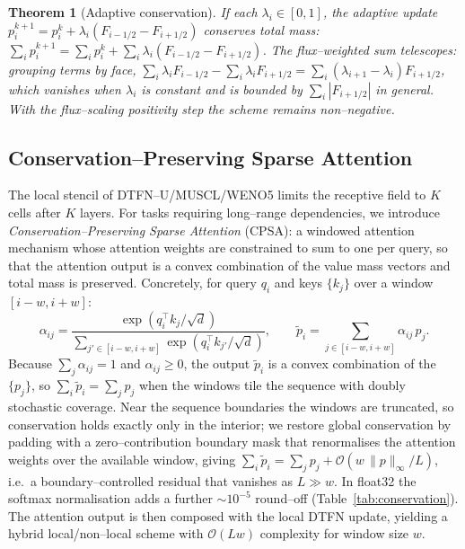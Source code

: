 \documentclass[10pt]{article}
\newtheorem{theorem}{Theorem}
\theoremstyle{definition}
\theoremstyle{remark}
\begin{document}
\begin{theorem}[Adaptive conservation]
  \label{thm:adaptive}
  If each $\lambda_i \in [0,1]$, the adaptive update
  $p^{k+1}_i = p^k_i + \lambda_i (F_{i-1/2} - F_{i+1/2})$ conserves
  total mass:
  $\sum_i p^{k+1}_i = \sum_i p^k_i + \sum_i \lambda_i(F_{i-1/2} - F_{i+1/2})$.
  The flux--weighted sum telescopes: grouping terms by face,
  $\sum_i \lambda_i F_{i-1/2} - \sum_i \lambda_i F_{i+1/2} = \sum_i
  (\lambda_{i+1} - \lambda_i) F_{i+1/2}$, which vanishes when
  $\lambda_i$ is constant and is bounded by $\sum_i |F_{i+1/2}|$ in
  general.  With the flux--scaling positivity step the scheme remains
  non--negative.
\end{theorem}

\subsection{Conservation--Preserving Sparse Attention}
\label{sec:cpsa}

The local stencil of DTFN--U/MUSCL/WENO5 limits the receptive field
to $K$ cells after $K$ layers.  For tasks requiring long--range
dependencies, we introduce \emph{Conservation--Preserving Sparse
Attention} (CPSA): a windowed attention mechanism whose attention
weights are constrained to sum to one per query, so that the
attention output is a convex combination of the value mass vectors
and total mass is preserved.  Concretely, for query $q_i$ and keys
$\{k_j\}$ over a window $[i-w, i+w]$:
\[
  \alpha_{ij} = \frac{\exp(q_i^\top k_j / \sqrt{d})}{\sum_{j' \in [i-w,i+w]} \exp(q_i^\top k_{j'} / \sqrt{d})},
  \qquad
  \tilde p_i = \sum_{j \in [i-w,i+w]} \alpha_{ij}\, p_j.
\]
Because $\sum_j \alpha_{ij} = 1$ and $\alpha_{ij} \ge 0$, the output
$\tilde p_i$ is a convex combination of the $\{p_j\}$, so
$\sum_i \tilde p_i = \sum_j p_j$ when the windows tile the sequence
with doubly stochastic coverage.  Near the sequence boundaries the
windows are truncated, so conservation holds exactly only in the
interior; we restore global conservation by padding with a
zero--contribution boundary mask that renormalises the attention
weights over the available window, giving
$\sum_i \tilde p_i = \sum_j p_j + \mathcal{O}(w \,\|p\|_\infty / L)$,
i.e.\ a boundary--controlled residual that vanishes as $L \gg w$.
In float32 the softmax normalisation adds a further $\sim 10^{-5}$
round--off (Table~\ref{tab:conservation}).  The attention output is
then composed with the local DTFN update, yielding a hybrid
local/non--local scheme with $\mathcal{O}(L w)$ complexity for window
size $w$.
\end{document}

